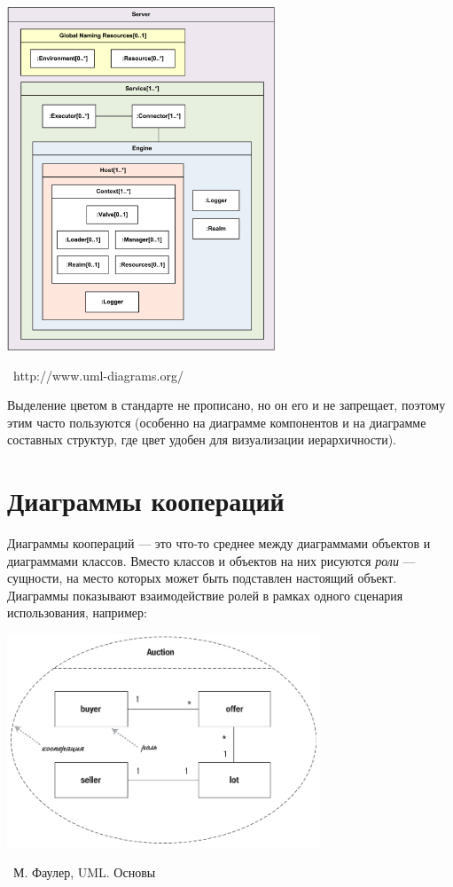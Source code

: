 \documentclass[a5paper]{article}
\newcommand{\attribution}[1] {
    \vspace{-5mm}\begin{flushright}\begin{scriptsize}%
    {\textcopyright\, #1}\end{scriptsize}\end{flushright}
}
\begin{document}
\begin{center}
    \includegraphics[width=0.6\textwidth]{compositeStructureExample.png}
    \attribution{http://www.uml-diagrams.org/}
\end{center}

Выделение цветом в стандарте не прописано, но он его и не запрещает, поэтому этим часто пользуются (особенно на диаграмме компонентов и на диаграмме составных структур, где цвет удобен для визуализации иерархичности).

\section{Диаграммы коопераций}

Диаграммы коопераций --- это что-то среднее между диаграммами объектов и диаграммами классов. Вместо классов и объектов на них рисуются \textit{роли} --- сущности, на место которых может быть подставлен настоящий объект. Диаграммы показывают взаимодействие ролей в рамках одного сценария использования, например:

\begin{center}
    \includegraphics[width=0.7\textwidth]{cooperationDiagram.png}
    \attribution{М. Фаулер, UML. Основы}
\end{center}
\end{document}
